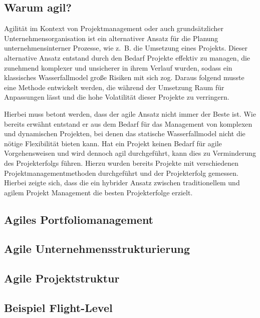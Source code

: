 \subsection{Warum agil?}
Agilität im Kontext von Projektmanagement oder auch grundsätzlicher Unternehmensorganisation ist ein alternativer Ansatz für die Planung unternehmensinterner Prozesse, wie z. B. die Umsetzung eines Projekts. Dieser alternative Ansatz entstand durch den Bedarf Projekte effektiv zu managen, die zunehmend komplexer und unsicherer in ihrem Verlauf wurden, sodass ein klassisches Wasserfallmodel große Risiken mit sich zog. Daraus folgend musste eine Methode entwickelt werden, die während der Umsetzung Raum für Anpassungen lässt und die hohe Volatilität dieser Projekte zu verringern. \cite{agilismVsTranditionalApproaches}

Hierbei muss betont werden, dass der agile Ansatz nicht immer der Beste ist. Wie bereits erwähnt entstand er aus dem Bedarf für das Management von komplexen und dynamischen Projekten, bei denen das statische Wasserfallmodel nicht die nötige Flexibilität bieten kann. Hat ein Projekt keinen Bedarf für agile Vorgehensweisen und wird dennoch agil durchgeführt, kann dies zu Verminderung des Projekterfolgs führen. Hierzu wurden bereits Projekte mit verschiedenen Projektmanagementmethoden durchgeführt und der Projekterfolg gemessen. Hierbei zeigte sich, dass die ein hybrider Ansatz zwischen traditionellem und agilem Projekt Management die besten Projekterfolge erzielt. \cite{traditionalAndAgileOnProjectSuccess}
\subsection{Agiles Portfoliomanagement}

\subsection{Agile Unternehmensstrukturierung}

\subsection{Agile Projektstruktur}

\subsection{Beispiel Flight-Level}
